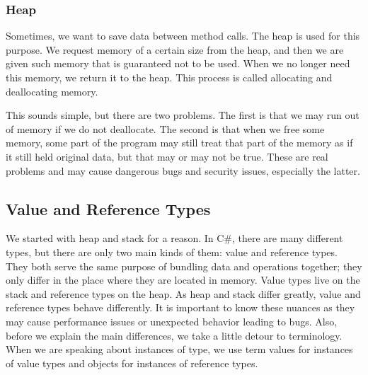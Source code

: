 \subsubsection{Heap}
Sometimes, we want to save data between method calls. The heap is used for this purpose. We request memory of a certain size from the heap, and then we are given such memory that is guaranteed not to be used. When we no longer need this memory, we return it to the heap. This process is called allocating and deallocating memory.

This sounds simple, but there are two problems. The first is that we may run out of memory if we do not deallocate. The second is that when we free some memory, some part of the program may still treat that part of the memory as if it still held original data, but that may or may not be true. These are real problems and may cause dangerous bugs and security issues, especially the latter.

\subsection{Value and Reference Types}

We started with heap and stack for a reason. In C\#, there are many different types, but there are only two main kinds of them: value and reference types. They both serve the same purpose of bundling data and operations together; they only differ in the place where they are located in memory. Value types live on the stack and reference types on the heap. As heap and stack differ greatly, value and reference types behave differently. It is important to know these nuances as they may cause performance issues or unexpected behavior leading to bugs. Also, before we explain the main differences, we take a little detour to terminology. When we are speaking about instances of type, we use term values for instances of value types and objects for instances of reference types.


